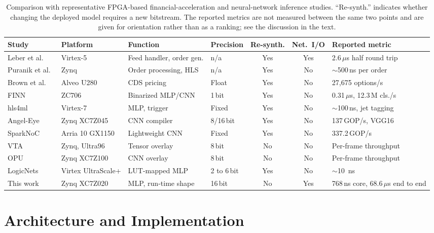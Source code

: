 \documentclass[final,5p,times,twocolumn]{elsarticle}
\begin{document}
\begin{table}[t]
\centering
\caption{Comparison with representative FPGA-based financial-acceleration and
neural-network inference studies. ``Re-synth.'' indicates whether changing the
deployed model requires a new bitstream. The reported metrics are not measured
between the same two points and are given for orientation rather than as a
ranking; see the discussion in the text.}
\label{tab:related_work}
\small
\begin{tabular}{@{}L{2.0cm}L{2.0cm}L{2.4cm}L{1.2cm}ccL{2.4cm}@{}}
\toprule
Study & Platform & Function & Precision & Re-synth. & Net.\ I/O & Reported metric \\
\midrule
Leber et al.~\cite{Leber2011} & Virtex-5 & Feed handler, order gen. & n/a & Yes & Yes & 2.6\,$\mu$s half round trip \\
Puranik et al.~\cite{Puranik2023} & Zynq & Order processing, HLS & n/a & Yes & No & $\sim$500\,ns per order \\
Brown et al.~\cite{Brown2021} & Alveo U280 & CDS pricing & Float & Yes & No & 27{,}675 options/s \\
FINN~\cite{Umuroglu2017} & ZC706 & Binarized MLP/CNN & 1\,bit & Yes & No & 0.31\,$\mu$s, 12.3\,M cls./s \\
hls4ml~\cite{Duarte2018} & Virtex-7 & MLP, trigger & Fixed & Yes & No & $\sim$100\,ns, jet tagging \\
Angel-Eye~\cite{Guo2018} & Zynq XC7Z045 & CNN compiler & 8/16\,bit & Yes & No & 137\,GOP/s, VGG16 \\
SparkNoC~\cite{sparknoc} & Arria 10 GX1150 & Lightweight CNN & Fixed & Yes & No & 337.2\,GOP/s \\
\addlinespace
VTA~\cite{Moreau2019} & Zynq, Ultra96 & Tensor overlay & 8\,bit & No & No & Per-frame throughput \\
OPU~\cite{Yu2020} & Zynq XC7Z100 & CNN overlay & 8\,bit & No & No & Per-frame throughput \\
LogicNets~\cite{Umuroglu2020} & Virtex Ultra\-Scale+ & LUT-mapped MLP & 2 to 6\,bit & Yes & No & $\sim$\SI{10}{\nano\second} \\
\addlinespace
This work & Zynq XC7Z020 & MLP, run-time shape & 16\,bit & No & Yes & 768\,ns core, 68.6\,$\mu$s end to end \\
\bottomrule
\end{tabular}
\end{table}

\section{Architecture and Implementation}
\label{sec:framework}
\end{document}
